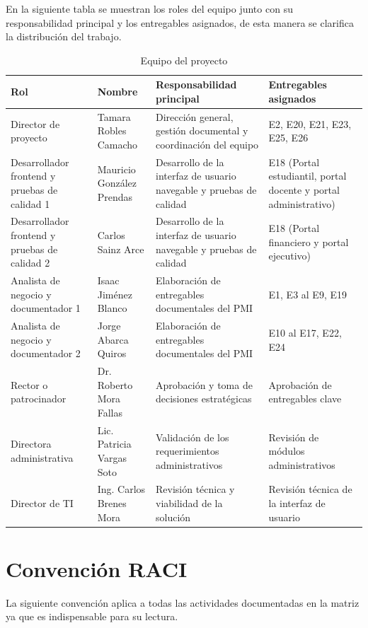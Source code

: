 \documentclass[11pt,spanish]{article}
\begin{document}
En la siguiente tabla se muestran los roles del equipo junto con su responsabilidad principal y los entregables asignados, de esta manera se clarifica la distribución del trabajo.


\begin{table}[H]
\centering
\caption{Equipo del proyecto}
\label{tab:equipo-proyecto}
{\small
\setlength{\tabcolsep}{3.5pt}
\begin{tabularx}{\textwidth}{p{3.5cm} p{3.2cm} Y p{4.2cm}}
\toprule
\textbf{Rol} & \textbf{Nombre} & \textbf{Responsabilidad principal} & \textbf{Entregables asignados} \\
\midrule
Director de proyecto & Tamara Robles Camacho & Dirección general, gestión documental y coordinación del equipo & E2, E20, E21, E23, E25, E26 \\
Desarrollador frontend y pruebas de calidad 1 & Mauricio González Prendas & Desarrollo de la interfaz de usuario navegable y pruebas de calidad & E18 (Portal estudiantil, portal docente y portal administrativo) \\
Desarrollador frontend y pruebas de calidad 2 & Carlos Sainz Arce & Desarrollo de la interfaz de usuario navegable y pruebas de calidad & E18 (Portal financiero y portal ejecutivo) \\
Analista de negocio y documentador 1 & Isaac Jiménez Blanco & Elaboración de entregables documentales del PMI & E1, E3 al E9, E19 \\
Analista de negocio y documentador 2 & Jorge Abarca Quiros & Elaboración de entregables documentales del PMI & E10 al E17, E22, E24 \\
Rector o patrocinador & Dr. Roberto Mora Fallas & Aprobación y toma de decisiones estratégicas & Aprobación de entregables clave \\
Directora administrativa & Lic. Patricia Vargas Soto & Validación de los requerimientos administrativos & Revisión de módulos administrativos \\
Director de TI & Ing. Carlos Brenes Mora & Revisión técnica y viabilidad de la solución & Revisión técnica de la interfaz de usuario \\
\bottomrule
\end{tabularx}
}
\end{table}


\section{Convención RACI}

La siguiente convención aplica a todas las actividades documentadas en la matriz ya que es indispensable para su lectura.
\end{document}
